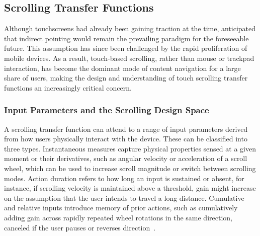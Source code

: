 \documentclass[12pt,a4paper]{report}
\begin{document}
        \subsection{Scrolling Transfer Functions}

        Although touchscreens had already been gaining traction at the time, \citeauthor{casiez2011no} anticipated that indirect pointing would remain the prevailing paradigm for the foreseeable future. This assumption has since been challenged by the rapid proliferation of mobile devices. As a result, touch-based scrolling, rather than mouse or trackpad interaction, has become the dominant mode of content navigation for a large share of users, making the design and understanding of touch scrolling transfer functions an increasingly critical concern. 

        \subsubsection{Input Parameters and the Scrolling Design Space}

        A scrolling transfer function can attend to a range of input parameters derived from how users physically interact with the device. These can be classified into three types. Instantaneous measures capture physical properties sensed at a given moment or their derivatives, such as angular velocity or acceleration of a scroll wheel, which can be used to increase scroll magnitude or switch between scrolling modes. Action duration refers to how long an input is sustained or absent, for instance, if scrolling velocity is maintained above a threshold, gain might increase on the assumption that the user intends to travel a long distance. Cumulative and relative inputs introduce memory of prior actions, such as cumulatively adding gain across rapidly repeated wheel rotations in the same direction, canceled if the user pauses or reverses direction~\cite{quinn2012exposing}.
\end{document}
